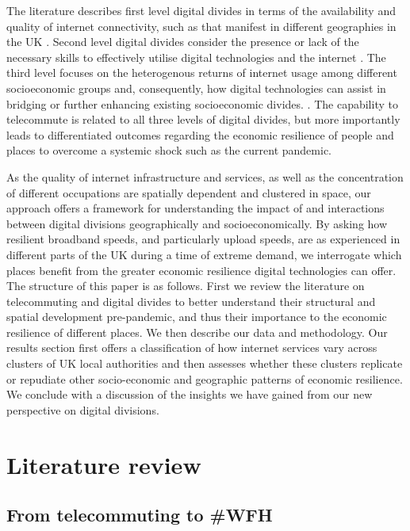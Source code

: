 \documentclass[Royal,times,sageh]{sagej}
\begin{document}
The literature describes first level digital divides in terms of the
availability and quality of internet connectivity, such as that manifest
in different geographies in the UK
\citep{riddlesden2014broadband, philip2017digital}. Second level digital
divides consider the presence or lack of the necessary skills to
effectively utilise digital technologies and the internet
\citep{blank2014dimensions, van2011internet}. The third level focuses on
the heterogenous returns of internet usage among different socioeconomic
groups and, consequently, how digital technologies can assist in
bridging or further enhancing existing socioeconomic divides.
\citep{stern2009levels, van2014digital, van2015third}. The capability to
telecommute is related to all three levels of digital divides, but more
importantly leads to differentiated outcomes regarding the economic
resilience of people and places to overcome a systemic shock such as the
current pandemic.

As the quality of internet infrastructure and services, as well as the
concentration of different occupations are spatially dependent and
clustered in space, our approach offers a framework for understanding
the impact of and interactions between digital divisions geographically
and socioeconomically. By asking how resilient broadband speeds, and
particularly upload speeds, are as experienced in different parts of the
UK during a time of extreme demand, we interrogate which places benefit
from the greater economic resilience digital technologies can offer. The
structure of this paper is as follows. First we review the literature on
telecommuting and digital divides to better understand their structural
and spatial development pre-pandemic, and thus their importance to the
economic resilience of different places. We then describe our data and
methodology. Our results section first offers a classification of how
internet services vary across clusters of UK local authorities and then
assesses whether these clusters replicate or repudiate other
socio-economic and geographic patterns of economic resilience. We
conclude with a discussion of the insights we have gained from our new
perspective on digital divisions.

\hypertarget{sec:2}{%
\section{Literature review}\label{sec:2}}

\hypertarget{sec:2.1}{%
\subsection{From telecommuting to \#WFH}\label{sec:2.1}}
\end{document}
